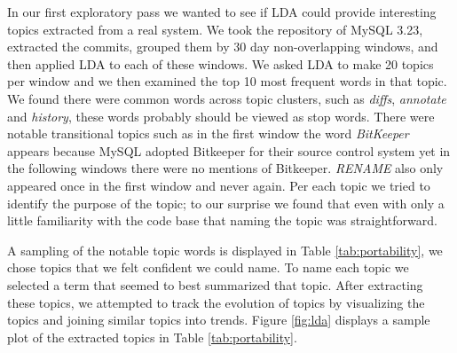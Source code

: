 \documentclass[times, 10pt,twocolumn]{article}
\begin{document}
In our first exploratory pass we wanted to see if LDA could provide
interesting topics extracted from a real system. We took the
repository of MySQL 3.23, extracted the commits, grouped them by 30
day non-overlapping windows, and then applied LDA to each of these
windows. We asked LDA to make 20 topics per window and we then
 examined the top 10 most frequent words in that topic.  We
found there were common words across topic clusters, such as
\emph{diffs}, \emph{annotate} and \emph{history}, these words probably should
be viewed as stop words. There were notable transitional topics such
as in the first window the word \emph{BitKeeper} appears because MySQL
adopted Bitkeeper for their source control system yet in the following
windows there were no mentions of Bitkeeper. \emph{RENAME} also only
appeared once in the first window and never again. Per each topic we
tried to identify the purpose of the topic; to our surprise we found
that even with only a little familiarity with the code base that
naming the topic was straightforward.

A sampling of the notable topic words is displayed in Table
\ref{tab:portability}, we chose topics that we felt confident we could
name.  To name each topic we selected a term that seemed to best
summarized that topic.  After extracting these topics, we attempted to
track the evolution of topics by visualizing the topics and joining
similar topics into trends.  Figure \ref{fig:lda} displays a sample
plot of the extracted topics in Table \ref{tab:portability}.


\end{document}
